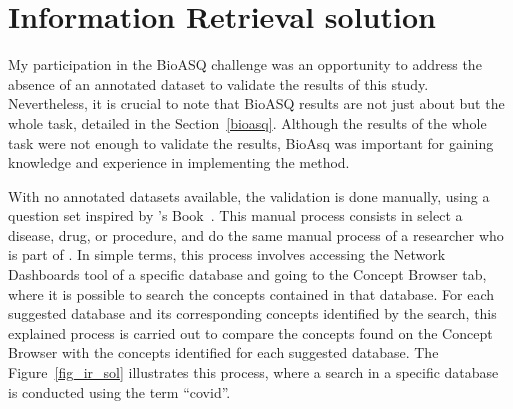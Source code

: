 \section{Information Retrieval solution}



My participation in the BioASQ challenge was an opportunity to address the absence of an annotated dataset to validate the results of this study. Nevertheless, it is crucial to note that BioASQ results are not just about {\ir} but the whole task, detailed in the Section~\ref{bioasq}. Although the results of the whole task were not enough to validate the {\ir} results, BioAsq was important for gaining knowledge and experience in implementing the method.


With no annotated datasets available, the {\bm} validation is done manually, using a question set inspired by {\ohdsi}'s Book~\cite{informatics_book_nodate}. This manual process consists in select a disease, drug, or procedure, and do the same manual process of a researcher who is part of {\ehden}. In simple terms, this process involves accessing the Network Dashboards tool of a specific database and going to the Concept Browser tab, where it is possible to search the concepts contained in that database. For each suggested database and its corresponding concepts identified by the search, this explained process is carried out to compare the concepts found on the Concept Browser with the concepts identified for each suggested database. The Figure~\ref{fig_ir_sol} illustrates this process, where a search in a specific database is conducted using the term ``covid''. 


